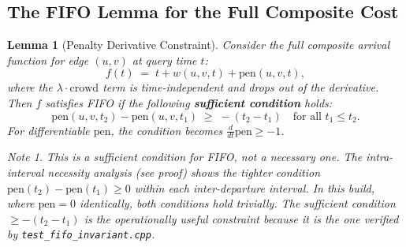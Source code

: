 \documentclass[11pt, a4paper]{article}
\newtheorem{lemma}[theorem]{Lemma}
\theoremstyle{remark}
\newtheorem*{note}{Note}
\newcommand{\crowd}{\mathrm{crowd}}
\newcommand{\pen}{\mathrm{pen}}
\begin{document}
\subsection{The FIFO Lemma for the Full Composite Cost}

\begin{lemma}[Penalty Derivative Constraint]
    \label{lem:fifo-pen}
    Consider the full composite arrival function for edge $(u,v)$ at query
    time $t$:
    \[
        f(t) \;=\; t + w(u, v, t) + \pen(u, v, t),
    \]
    where the $\lambda \cdot \crowd$ term is time-independent and drops out of
    the derivative. Then $f$ satisfies FIFO if the following \textbf{sufficient
    condition} holds:
    \[
        \pen(u, v, t_2) - \pen(u, v, t_1)
        \;\ge\; -(t_2 - t_1)
        \quad \text{for all } t_1 \le t_2.
    \]
    For differentiable $\pen$, the condition becomes $\frac{d}{dt}\pen \ge -1$.
    \begin{note}
    This is a \emph{sufficient} condition for FIFO, not a necessary one.
    The intra-interval necessity analysis (see proof) shows the tighter condition
    $\pen(t_2) - \pen(t_1) \ge 0$ within each inter-departure interval.
    In this build, where $\pen = 0$ identically, both conditions hold
    trivially. The sufficient condition $\ge -(t_2-t_1)$ is the operationally
    useful constraint because it is the one verified by \texttt{test\_fifo\_invariant.cpp}.
    \end{note}
\end{lemma}
\end{document}
